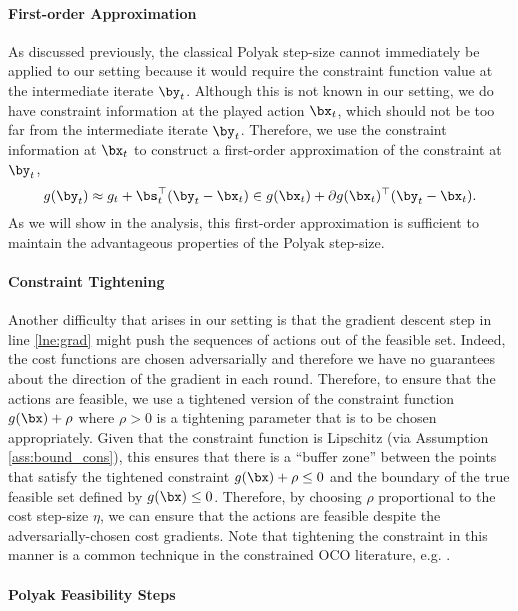 \paragraph{First-order Approximation}

As discussed previously, the classical Polyak step-size cannot immediately be applied to our setting because it would require the constraint function value at the intermediate iterate $\by_t$.
Although this is not known in our setting, we do have constraint information at the played action $\bx_t$, which should not be too far from the intermediate iterate $\by_t$. 
Therefore, we use the constraint information at $\bx_t$ to construct a first-order approximation of the constraint at $\by_t$,
\begin{equation}
    \label{eqn:first_ord}
    g(\by_t) \approx g_t + \bs_t^\top (\by_{t} - \bx_t) \in g(\bx_t) + \partial g(\bx_t)^\top (\by_{t} - \bx_t).
\end{equation}
As we will show in the analysis, this first-order approximation is sufficient to maintain the advantageous properties of the Polyak step-size.

\paragraph{Constraint Tightening}

Another difficulty that arises in our setting is that the gradient descent step in line \ref{lne:grad} might push the sequences of actions out of the feasible set.
Indeed, the cost functions are chosen adversarially and therefore we have no guarantees about the direction of the gradient in each round.
Therefore, to ensure that the actions are feasible, we use a tightened version of the constraint function $g(\bx) + \rho$ where $\rho > 0$ is a tightening parameter that is to be chosen appropriately.
Given that the constraint function is Lipschitz (via Assumption \ref{ass:bound_cons}), this ensures that there is a ``buffer zone'' between the points that satisfy the tightened constraint $g(\bx) + \rho \leq 0$ and the boundary of the true feasible set defined by $g(\bx) \leq 0$.
Therefore, by choosing $\rho$ proportional to the cost step-size $\eta$, we can ensure that the actions are feasible despite the adversarially-chosen cost gradients.
Note that tightening the constraint in this manner is a common technique in the constrained OCO literature, e.g. \cite{mahdavi2012trading,jenatton2016adaptive}.

\paragraph{Polyak Feasibility Steps}

